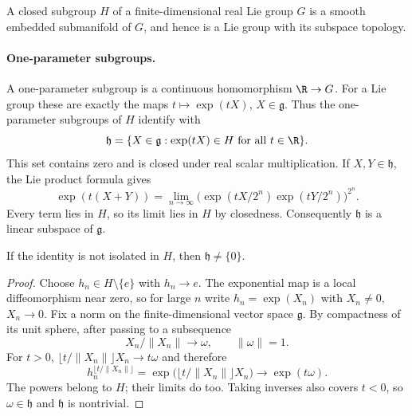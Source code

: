 
\begin{theorem}
A closed subgroup $H$ of a finite-dimensional real Lie group $G$ is a
smooth embedded submanifold of $G$, and hence is a Lie group with its
subspace topology.
\end{theorem}
\paragraph{One-parameter subgroups.}
A one-parameter subgroup is a continuous homomorphism $\R\to G$.
For a Lie group these are exactly the maps $t\mapsto\exp(tX)$,
$X\in\mathfrak g$. Thus the one-parameter subgroups of $H$ identify with
\[
 \mathfrak h=\{X\in\mathfrak g:\exp(tX)\in H\text{ for all }t\in\R\}.
\]
This set contains zero and is closed under real scalar multiplication.
If $X,Y\in\mathfrak h$, the Lie product formula gives
\[
 \exp(t(X+Y))=
 \lim_{n\to\infty}\bigl(\exp(tX/2^n)\exp(tY/2^n)\bigr)^{2^n}.
\]
Every term lies in $H$, so its limit lies in $H$ by closedness.
Consequently $\mathfrak h$ is a linear subspace of $\mathfrak g$.

\begin{lemma}
If the identity is not isolated in $H$, then $\mathfrak h\ne\{0\}$.
\end{lemma}
\begin{proof}
Choose $h_n\in H\setminus\{e\}$ with $h_n\to e$.
The exponential map is a local diffeomorphism near zero, so for large $n$
write $h_n=\exp(X_n)$ with $X_n\ne0$, $X_n\to0$.
Fix a norm on the finite-dimensional vector space $\mathfrak g$.
By compactness of its unit sphere, after passing to a subsequence
\[
 X_n/\|X_n\|\longrightarrow\omega,\qquad\|\omega\|=1.
\]
For $t>0$,
$\lfloor t/\|X_n\|\rfloor X_n\to t\omega$ and therefore
\[
 h_n^{\lfloor t/\|X_n\|\rfloor}
 =\exp\bigl(\lfloor t/\|X_n\|\rfloor X_n\bigr)
 \longrightarrow\exp(t\omega).
\]
The powers belong to $H$; their limits do too. Taking inverses also covers
$t<0$, so $\omega\in\mathfrak h$ and $\mathfrak h$ is nontrivial.
\end{proof}

